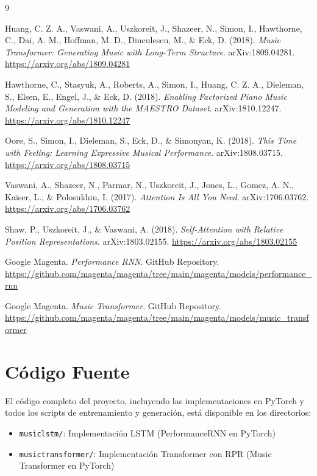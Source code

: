 \documentclass[12pt,a4paper]{article}
\begin{document}
\begin{thebibliography}{9}

Huang, C. Z. A., Vaswani, A., Uszkoreit, J., Shazeer, N., Simon, I., Hawthorne, C., Dai, A. M., Hoffman, M. D., Dinculescu, M., \& Eck, D. (2018).
\textit{Music Transformer: Generating Music with Long-Term Structure}.
arXiv:1809.04281.
\url{https://arxiv.org/abs/1809.04281}

Hawthorne, C., Stasyuk, A., Roberts, A., Simon, I., Huang, C. Z. A., Dieleman, S., Elsen, E., Engel, J., \& Eck, D. (2018).
\textit{Enabling Factorized Piano Music Modeling and Generation with the MAESTRO Dataset}.
arXiv:1810.12247.
\url{https://arxiv.org/abs/1810.12247}

Oore, S., Simon, I., Dieleman, S., Eck, D., \& Simonyan, K. (2018).
\textit{This Time with Feeling: Learning Expressive Musical Performance}.
arXiv:1808.03715.
\url{https://arxiv.org/abs/1808.03715}

Vaswani, A., Shazeer, N., Parmar, N., Uszkoreit, J., Jones, L., Gomez, A. N., Kaiser, L., \& Polosukhin, I. (2017).
\textit{Attention Is All You Need}.
arXiv:1706.03762.
\url{https://arxiv.org/abs/1706.03762}

Shaw, P., Uszkoreit, J., \& Vaswani, A. (2018).
\textit{Self-Attention with Relative Position Representations}.
arXiv:1803.02155.
\url{https://arxiv.org/abs/1803.02155}

Google Magenta.
\textit{Performance RNN}.
GitHub Repository.
\url{https://github.com/magenta/magenta/tree/main/magenta/models/performance_rnn}

Google Magenta.
\textit{Music Transformer}.
GitHub Repository.
\url{https://github.com/magenta/magenta/tree/main/magenta/models/music_transformer}

\end{thebibliography}

\section*{Código Fuente}

El código completo del proyecto, incluyendo las implementaciones en PyTorch y todos los scripts de entrenamiento y generación, está disponible en los directorios:
\begin{itemize}
    \item \texttt{musiclstm/}: Implementación LSTM (PerformanceRNN en PyTorch)
    \item \texttt{musictransformer/}: Implementación Transformer con RPR (Music Transformer en PyTorch)
\end{itemize}
\end{document}
